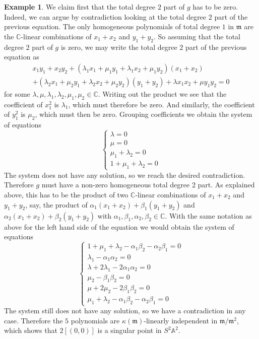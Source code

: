 \documentclass[12pt,a4paper]{amsart}
\theoremstyle{plain}
\theoremstyle{definition}
\newtheorem{exmp}[thm]{Example}
\theoremstyle{remark}
\begin{document}
\begin{exmp}
  We claim first that the total degree $2$ part of $g$ has to be zero.
  Indeed, we can argue by contradiction looking at the total degree $2$ part of the previous equation.
  The only homogeneous polynomials of total degree $1$ in $\mathfrak{m}$ are the $\mathbb{C}$-linear combinations of $x_{1} + x_{2}$ and $y_{1} + y_{2}$.
  So assuming that the total degree $2$ part of $g$ is zero, we may write the total degree $2$ part of the previous equation as
  \begin{align*}
    x_{1}y_{1} + x_{2}y_{2} + (\lambda_{1}x_{1} + \mu_{1}y_{1} + \lambda_{1} x_{2} + \mu_{1} y_{2})(x_{1} + x_{2}) \\
    + (\lambda_{2} x_{1} + \mu_{2} y_{1} + \lambda_{2} x_{2} + \mu_{2} y_{2})(y_{1} + y_{2}) + \lambda x_{1}x_{2} + \mu y_{1} y_{2} = 0 
  \end{align*}
  for some $\lambda, \mu, \lambda_{1}, \lambda_{2}, \mu_{1}, \mu_{2} \in \mathbb{C}$.
  Writing out the product we see that the coefficient of $x_{1}^{2}$ is $\lambda_{1}$, which must therefore be zero.
  And similarly, the coefficient of $y_{1}^{2}$ is $\mu_{2}$, which must then be zero.
  Grouping coefficients we obtain the system of equations
  \[
    \begin{cases}
      \lambda = 0 \\
      \mu = 0 \\
      \mu_{1} + \lambda_{2} = 0 \\
      1 + \mu_{1} + \lambda_{2} = 0
    \end{cases}
  \]
  The system does not have any solution, so we reach the desired contradiction.
  Therefore $g$ must have a non-zero homogeneous total degree $2$ part.
  As explained above, this has to be the product of two $\mathbb{C}$-linear combinations of $x_{1} + x_{2}$ and $y_{1} + y_{2}$, say, the product of $\alpha_{1}(x_{1} + x_{2}) + \beta_{1}(y_{1} + y_{2})$ and $\alpha_{2}(x_{1} + x_{2}) + \beta_{2}(y_{1} + y_{2})$ with $\alpha_{1}, \beta_{1}, \alpha_{2}, \beta_{2} \in \mathbb{C}$.
  With the same notation as above for the left hand side of the equation we would obtain the system of equations
  \[
    \begin{cases}
      1 + \mu_{1} + \lambda_{2} - \alpha_{1} \beta_{2} - \alpha_{2} \beta_{1} = 0 \\
      \lambda_{1} - \alpha_{1} \alpha_{2} = 0 \\
      \lambda + 2 \lambda_{1} - 2 \alpha_{1} \alpha_{2} = 0 \\
      \mu_{2} - \beta_{1} \beta_{2} =  0 \\
      \mu + 2 \mu_{2} - 2 \beta_{1} \beta_{2} = 0 \\
      \mu_{1} + \lambda_{2} - \alpha_{1} \beta_{2} - \alpha_{2} \beta_{1} = 0
    \end{cases}
  \]
  The system still does not have any solution, so we have a contradiction in any case.
  Therefore the $5$ polynomials are $\kappa(\mathfrak{m})$-linearly independent in $\mathfrak{m}/\mathfrak{m}^{2}$, which shows that $2[(0,0)]$ is a singular point in $S^{2}\mathbb{A}^{2}$.


\end{exmp}
\end{document}
